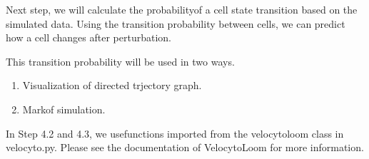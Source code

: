 \documentclass[letterpaper,10pt,english]{sphinxmanual}
\begin{document}
Next step, we will calculate the probabilityof a cell state transition based on the simulated data. Using the transition probability between cells, we can predict how a cell changes after perturbation.

This transition probability will be used in two ways.
\begin{enumerate}
%
\item {} 
Visualization of directed trjectory graph.

\item {} 
Markof simulation.

\end{enumerate}

In Step 4.2 and 4.3, we usefunctions imported from the velocytoloom class in velocyto.py. Please see the documentation of VelocytoLoom for more information. 

{
\begin{sphinxVerbatim}[commandchars=\\\{\}]
\llap{\color{nbsphinxin}[35]:\,\hspace{\fboxrule}\hspace{\fboxsep}}
  

  

   
\end{sphinxVerbatim}
}
\end{document}
